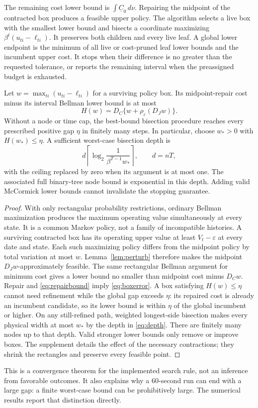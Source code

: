 The remaining cost lower bound is $\int\underline C_0\,d\nu$. Repairing the midpoint of the contracted box produces a feasible upper policy. The algorithm selects a live box with the smallest lower bound and bisects a coordinate maximizing $\beta^t(u_{ti}-\ell_{ti})$. It preserves both children and every live leaf. A global lower endpoint is the minimum of all live or cost-pruned leaf lower bounds and the incumbent upper cost. It stops when their difference is no greater than the requested tolerance, or reports the remaining interval when the preassigned budget is exhausted.

\begin{proposition}\label{prop:spatial}
Let $w=\max_{ti}(u_{ti}-\ell_{ti})$ for a surviving policy box. Its midpoint-repair cost minus its interval Bellman lower bound is at most
\begin{equation}\label{eq:boxerror}
 H(w)=D_C\{w+\rho_\varepsilon(D_Jw)\}.
\end{equation}
Without a node or time cap, the best-bound bisection procedure reaches every prescribed positive gap $\eta$ in finitely many steps. In particular, choose $w_*>0$ with $H(w_*)\leq\eta$. A sufficient worst-case bisection depth is
\begin{equation}\label{eq:depth}
 d\left\lceil\log_2\frac{1}{\beta^{T-1}w_*}\right\rceil,
 \qquad d=nT,
\end{equation}
with the ceiling replaced by zero when its argument is at most one. The associated full binary-tree node bound is exponential in this depth. Adding valid McCormick lower bounds cannot invalidate the stopping guarantee.
\end{proposition}
\begin{proof}
With only rectangular probability restrictions, ordinary Bellman maximization produces the maximum operating value simultaneously at every state. It is a common Markov policy, not a family of incompatible histories. A surviving contracted box has its operating upper value at least $V_t-\varepsilon$ at every date and state. Each such maximizing policy differs from the midpoint policy by total variation at most $w$. Lemma~\ref{lem:perturb} therefore makes the midpoint $D_Jw$-approximately feasible. The same rectangular Bellman argument for minimum cost gives a lower bound no smaller than midpoint cost minus $D_Cw$. Repair and \eqref{eq:repairbound} imply \eqref{eq:boxerror}. A box satisfying $H(w)\leq\eta$ cannot need refinement while the global gap exceeds $\eta$: its repaired cost is already an incumbent candidate, so its lower bound is within $\eta$ of the global incumbent or higher. On any still-refined path, weighted longest-side bisection makes every physical width at most $w_*$ by the depth in \eqref{eq:depth}. There are finitely many nodes up to that depth. Valid stronger lower bounds only remove or improve boxes. The supplement details the effect of the necessary contractions; they shrink the rectangles and preserve every feasible point.
\end{proof}

This is a convergence theorem for the implemented search rule, not an inference from favorable outcomes. It also explains why a 60-second run can end with a large gap: a finite worst-case bound can be prohibitively large. The numerical results report that distinction directly.

